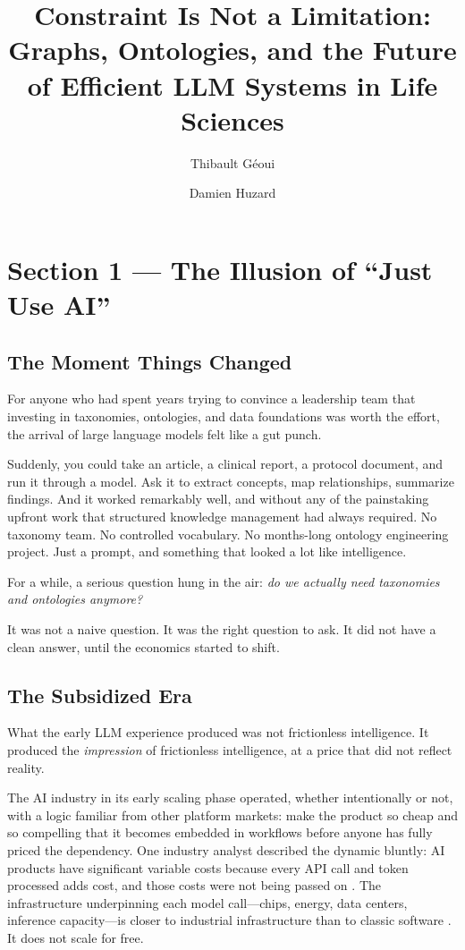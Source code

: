 \documentclass[man,12pt,donotrepeattitle]{apa7}
\title{Constraint Is Not a Limitation: Graphs, Ontologies, and the Future of Efficient LLM Systems in Life Sciences}
\author{Thibault G\'{e}oui \and Damien Huzard}
\affiliation{Independent Scholars}
\begin{document}
\maketitle


\section{Section 1 --- The Illusion of ``Just Use AI''}

\subsection{The Moment Things Changed}

For anyone who had spent years trying to convince a leadership team that
investing in taxonomies, ontologies, and data foundations was worth the
effort, the arrival of large language models felt like a gut punch.

Suddenly, you could take an article, a clinical report, a protocol
document, and run it through a model. Ask it to extract concepts, map
relationships, summarize findings. And it worked remarkably well, and
without any of the painstaking upfront work that structured knowledge
management had always required. No taxonomy team. No controlled
vocabulary. No months-long ontology engineering project. Just a prompt,
and something that looked a lot like intelligence.

For a while, a serious question hung in the air: \textit{do we actually
need taxonomies and ontologies anymore?}

It was not a naive question. It was the right question to ask. It did not
have a clean answer, until the economics started to shift.

\subsection{The Subsidized Era}

What the early LLM experience produced was not frictionless intelligence.
It produced the \textit{impression} of frictionless intelligence, at a
price that did not reflect reality.

The AI industry in its early scaling phase operated, whether intentionally
or not, with a logic familiar from other platform markets: make the product
so cheap and so compelling that it becomes embedded in workflows before
anyone has fully priced the dependency. One industry analyst described the
dynamic bluntly: AI products have significant variable costs because every
API call and token processed adds cost, and those costs were not being
passed on \parencite{a16z2024}. The infrastructure underpinning each model
call---chips, energy, data centers, inference capacity---is closer to
industrial infrastructure than to classic software \parencite{reutersbreaking2025}.
It does not scale for free.
\end{document}
